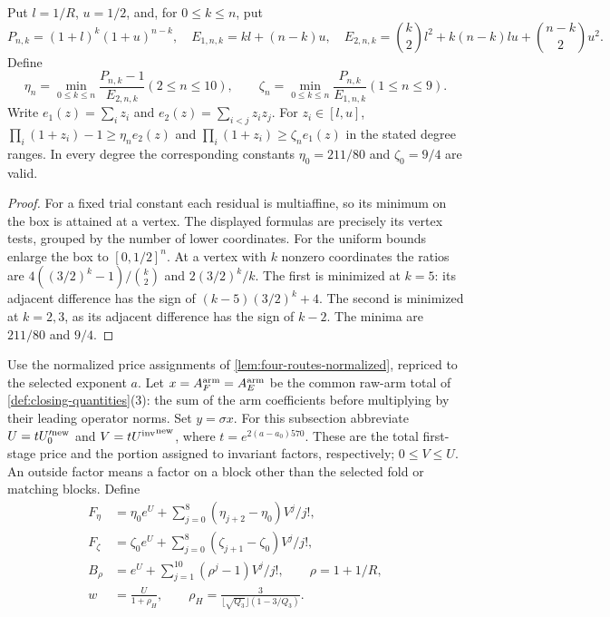 \begin{lemma}\label{lem:joint-multiaffine}
Put $l=1/R$, $u=1/2$, and, for $0\le k\le n$, put
\[
 P_{n,k}=(1+l)^k(1+u)^{n-k},\quad
 E_{1,n,k}=kl+(n-k)u,\quad
 E_{2,n,k}=\binom k2l^2+k(n-k)lu+\binom{n-k}2u^2.
\]
Define
\[
 \eta_n=\min_{0\le k\le n}\frac{P_{n,k}-1}{E_{2,n,k}} (2\le n\le10),
 \qquad
 \zeta_n=\min_{0\le k\le n}\frac{P_{n,k}}{E_{1,n,k}} (1\le n\le9).
\]
Write $e_1(z)=\sum_i z_i$ and $e_2(z)=\sum_{i<j}z_iz_j$.
For $z_i\in[l,u]$,
$\prod_i(1+z_i)-1\ge\eta_n e_2(z)$ and
$\prod_i(1+z_i)\ge\zeta_n e_1(z)$ in the stated degree ranges.
In every degree the corresponding constants
$\eta_0=211/80$ and $\zeta_0=9/4$ are valid.
\end{lemma}

\begin{proof}
For a fixed trial constant each residual is multiaffine, so its minimum
on the box is attained at a vertex. The displayed formulas are precisely
its vertex tests, grouped by the number of lower coordinates.
For the uniform bounds enlarge the box to $[0,1/2]^n$.
At a vertex with $k$ nonzero coordinates the ratios are
$4((3/2)^k-1)/\binom k2$ and $2(3/2)^k/k$.
The first is minimized at $k=5$: its adjacent difference has the sign
of $(k-5)(3/2)^k+4$. The second is minimized at $k=2,3$,
as its adjacent difference has the sign of $k-2$.
The minima are $211/80$ and $9/4$.
\end{proof}

Use the normalized price assignments of
\cref{lem:four-routes-normalized}, repriced to the selected exponent $a$.
Let $x=A^{\rm arm}_F=A^{\rm arm}_E$ be the common raw-arm total of
\cref{def:closing-quantities}(3): the sum of the arm coefficients
before multiplying by their leading operator norms. Set $y=\sigma x$.
For this subsection abbreviate
$U=tU_0^{\prime\rm new}$ and $V=t{U^{\mathrm{inv}}}^{\rm new}$, where
$t=e^{2(a-a_0)570}$. These are the total first-stage price and the
portion assigned to invariant factors, respectively; $0\le V\le U$.
An outside factor means a factor on a block other than the selected
fold or matching blocks. Define
\begin{align*}
 F_\eta&=\eta_0e^U+\sum_{j=0}^8(\eta_{j+2}-\eta_0)V^j/j!,\\
 F_\zeta&=\zeta_0e^U+\sum_{j=0}^8(\zeta_{j+1}-\zeta_0)V^j/j!,\\
 B_\rho&=e^U+\sum_{j=1}^{10}(\rho^j-1)V^j/j!,\qquad \rho=1+1/R,\\
 w&=\frac{U}{1+\rho_H},\qquad
 \rho_H=\frac{3}{\lfloor\sqrt{Q_3}\rfloor(1-3/Q_3)}.
\end{align*}

